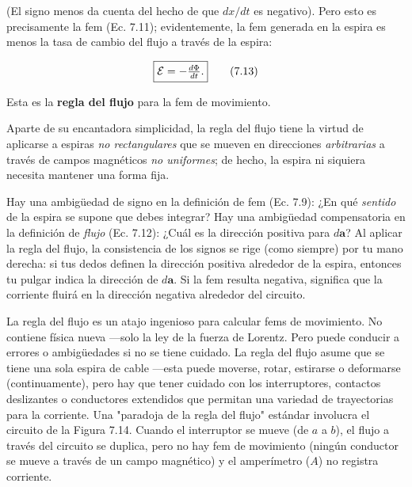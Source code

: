 \documentclass[12pt,a4paper]{report}
\newcommand{\esp}{\vspace{0.5cm}}
\begin{document}
	(El signo menos da cuenta del hecho de que $dx/dt$ es negativo). Pero esto es precisamente la fem (Ec. 7.11); evidentemente, la fem generada en la espira es menos la tasa de cambio del flujo a través de la espira:
	
	\esp
	
	\begin{equation}
		\fbox{$\mathcal{E} = -\frac{d\Phi}{dt}.$} \tag{7.13}
	\end{equation}
	
	\esp
	
	Esta es la \textbf{regla del flujo} para la fem de movimiento.
	
	\esp
	
	Aparte de su encantadora simplicidad, la regla del flujo tiene la virtud de aplicarse a espiras \textit{no rectangulares} que se mueven en direcciones \textit{arbitrarias} a través de campos magnéticos \textit{no uniformes}; de hecho, la espira ni siquiera necesita mantener una forma fija.
	
	\esp
	
	Hay una ambigüedad de signo en la definición de fem (Ec. 7.9): ¿En qué \textit{sentido} de la espira se supone que debes integrar? Hay una ambigüedad compensatoria en la definición de \textit{flujo} (Ec. 7.12): ¿Cuál es la dirección positiva para $d\mathbf{a}$? Al aplicar la regla del flujo, la consistencia de los signos se rige (como siempre) por tu mano derecha: si tus dedos definen la dirección positiva alrededor de la espira, entonces tu pulgar indica la dirección de $d\mathbf{a}$. Si la fem resulta negativa, significa que la corriente fluirá en la dirección negativa alrededor del circuito.
	
	\esp
	
	La regla del flujo es un atajo ingenioso para calcular fems de movimiento. No contiene física nueva —solo la ley de la fuerza de Lorentz. Pero puede conducir a errores o ambigüedades si no se tiene cuidado. La regla del flujo asume que se tiene una sola espira de cable —esta puede moverse, rotar, estirarse o deformarse (continuamente), pero hay que tener cuidado con los interruptores, contactos deslizantes o conductores extendidos que permitan una variedad de trayectorias para la corriente. Una "paradoja de la regla del flujo" estándar involucra el circuito de la Figura 7.14. Cuando el interruptor se mueve (de $a$ a $b$), el flujo a través del circuito se duplica, pero no hay fem de movimiento (ningún conductor se mueve a través de un campo magnético) y el amperímetro ($A$) no registra corriente.
	
\end{document}
